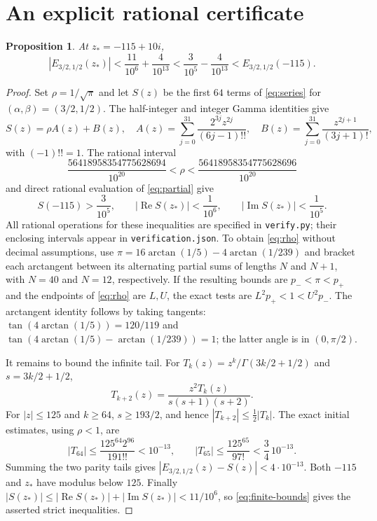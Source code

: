 \documentclass[11pt]{article}
\newtheorem{proposition}[theorem]{Proposition}
\newcommand{\Rea}{\operatorname{Re}}
\newcommand{\Ima}{\operatorname{Im}}
\begin{document}
\section{An explicit rational certificate}
\begin{proposition}\label{prop:finite}
At $z_*=-115+10i$,
\[
 |E_{3/2,1/2}(z_*)|<\frac{11}{10^6}+\frac4{10^{13}}
 <\frac3{10^5}-\frac4{10^{13}}<E_{3/2,1/2}(-115).
\]
\end{proposition}
\begin{proof}
Set $\rho=1/\sqrt\pi$ and let $S(z)$ be the first $64$ terms
of \eqref{eq:series} for $(\alpha,\beta)=(3/2,1/2)$.
The half-integer and integer Gamma identities give
\begin{equation}\label{eq:partial}
 S(z)=\rho A(z)+B(z),\quad
 A(z)=\sum_{j=0}^{31}\frac{2^{3j}z^{2j}}{(6j-1)!!},\quad
 B(z)=\sum_{j=0}^{31}\frac{z^{2j+1}}{(3j+1)!},
\end{equation}
with $(-1)!!=1$.
The rational interval
\begin{equation}\label{eq:rho}
 \frac{56418958354775628694}{10^{20}}<\rho<
 \frac{56418958354775628696}{10^{20}}
\end{equation}
and direct rational evaluation of \eqref{eq:partial} give
\begin{equation}\label{eq:finite-bounds}
 S(-115)>\frac3{10^5},\qquad
 |\Rea S(z_*)|<\frac1{10^6},\qquad
 |\Ima S(z_*)|<\frac1{10^5}.
\end{equation}
All rational operations for these inequalities are specified in
\texttt{verify.py}; their enclosing intervals appear in
\texttt{verification.json}.
To obtain \eqref{eq:rho} without decimal assumptions, use
$\pi=16\arctan(1/5)-4\arctan(1/239)$ and bracket each arctangent
between its alternating partial sums of lengths $N$ and $N+1$,
with $N=40$ and $N=12$, respectively.
If the resulting bounds are $p_-<\pi<p_+$ and the endpoints of
\eqref{eq:rho} are $L,U$, the exact tests are
$L^2p_+<1<U^2p_-$.
The arctangent identity follows by taking tangents:
$\tan(4\arctan(1/5))=120/119$ and
$\tan(4\arctan(1/5)-\arctan(1/239))=1$;
the latter angle is in $(0,\pi/2)$.

It remains to bound the infinite tail. For
$T_k(z)=z^k/\Gamma(3k/2+1/2)$ and $s=3k/2+1/2$,
\[
 T_{k+2}(z)=\frac{z^2 T_k(z)}{s(s+1)(s+2)}.
\]
For $|z|\le125$ and $k\ge64$, $s\ge193/2$, and hence
$|T_{k+2}|\le\tfrac12|T_k|$.
The exact initial estimates, using $\rho<1$, are
\[
 |T_{64}|\le\frac{125^{64}2^{96}}{191!!}<10^{-13},
 \qquad
 |T_{65}|\le\frac{125^{65}}{97!}<\frac34\,10^{-13}.
\]
Summing the two parity tails gives
$|E_{3/2,1/2}(z)-S(z)|<4\cdot10^{-13}$.
Both $-115$ and $z_*$ have modulus below $125$.
Finally $|S(z_*)|\le|\Rea S(z_*)|+|\Ima S(z_*)|<11/10^6$,
so \eqref{eq:finite-bounds} gives the asserted strict inequalities.
\end{proof}
\end{document}
